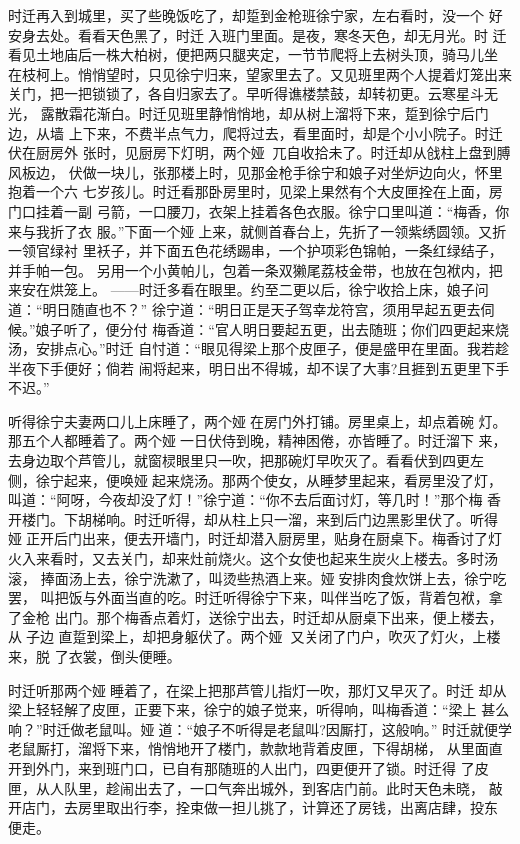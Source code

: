 时迁再入到城里，买了些晚饭吃了，却踅到金枪班徐宁家，左右看时，没一个
好安身去处。看看天色黑了，时迁入班门里面。是夜，寒冬天色，却无月光。时
迁看见土地庙后一株大柏树，便把两只腿夹定，一节节爬将上去树头顶，骑马儿坐
在枝柯上。悄悄望时，只见徐宁归来，望家里去了。又见班里两个人提着灯笼出来
关门，把一把锁锁了，各自归家去了。早听得谯楼禁鼓，却转初更。云寒星斗无光，
露散霜花渐白。时迁见班里静悄悄地，却从树上溜将下来，踅到徐宁后门边，从墙
上下来，不费半点气力，爬将过去，看里面时，却是个小小院子。时迁伏在厨房外
张时，见厨房下灯明，两个娅，兀自收拾未了。时迁却从戗柱上盘到膊风板边，
伏做一块儿，张那楼上时，见那金枪手徐宁和娘子对坐炉边向火，怀里抱着一个六
七岁孩儿。时迁看那卧房里时，见梁上果然有个大皮匣拴在上面，房门口挂着一副
弓箭，一口腰刀，衣架上挂着各色衣服。徐宁口里叫道：“梅香，你来与我折了衣
服。”下面一个娅上来，就侧首春台上，先折了一领紫绣圆领。又折一领官绿衬
里袄子，并下面五色花绣踢串，一个护项彩色锦帕，一条红绿结子，并手帕一包。
另用一个小黄帕儿，包着一条双獭尾荔枝金带，也放在包袱内，把来安在烘笼上。
——时迁多看在眼里。约至二更以后，徐宁收拾上床，娘子问道：“明日随直也不？”
徐宁道：“明日正是天子驾幸龙符宫，须用早起五更去伺候。”娘子听了，便分付
梅香道：“官人明日要起五更，出去随班；你们四更起来烧汤，安排点心。”时迁
自忖道：“眼见得梁上那个皮匣子，便是盛甲在里面。我若趁半夜下手便好；倘若
闹将起来，明日出不得城，却不误了大事?且捱到五更里下手不迟。”

听得徐宁夫妻两口儿上床睡了，两个娅在房门外打铺。房里桌上，却点着碗
灯。那五个人都睡着了。两个娅一日伏侍到晚，精神困倦，亦皆睡了。时迁溜下
来，去身边取个芦管儿，就窗棂眼里只一吹，把那碗灯早吹灭了。看看伏到四更左
侧，徐宁起来，便唤娅起来烧汤。那两个使女，从睡梦里起来，看房里没了灯，
叫道：“阿呀，今夜却没了灯！”徐宁道：“你不去后面讨灯，等几时！”那个梅
香开楼门。下胡梯响。时迁听得，却从柱上只一溜，来到后门边黑影里伏了。听得
娅正开后门出来，便去开墙门，时迁却潜入厨房里，贴身在厨桌下。梅香讨了灯
火入来看时，又去关门，却来灶前烧火。这个女使也起来生炭火上楼去。多时汤滚，
捧面汤上去，徐宁洗漱了，叫烫些热酒上来。娅安排肉食炊饼上去，徐宁吃罢，
叫把饭与外面当直的吃。时迁听得徐宁下来，叫伴当吃了饭，背着包袱，拿了金枪
出门。那个梅香点着灯，送徐宁出去，时迁却从厨桌下出来，便上楼去，从子边
直踅到梁上，却把身躯伏了。两个娅，又关闭了门户，吹灭了灯火，上楼来，脱
了衣裳，倒头便睡。

时迁听那两个娅睡着了，在梁上把那芦管儿指灯一吹，那灯又早灭了。时迁
却从梁上轻轻解了皮匣，正要下来，徐宁的娘子觉来，听得响，叫梅香道：“梁上
甚么响？”时迁做老鼠叫。娅道：“娘子不听得是老鼠叫?因厮打，这般响。”
时迁就便学老鼠厮打，溜将下来，悄悄地开了楼门，款款地背着皮匣，下得胡梯，
从里面直开到外门，来到班门口，已自有那随班的人出门，四更便开了锁。时迁得
了皮匣，从人队里，趁闹出去了，一口气奔出城外，到客店门前。此时天色未晓，
敲开店门，去房里取出行李，拴束做一担儿挑了，计算还了房钱，出离店肆，投东
便走。

